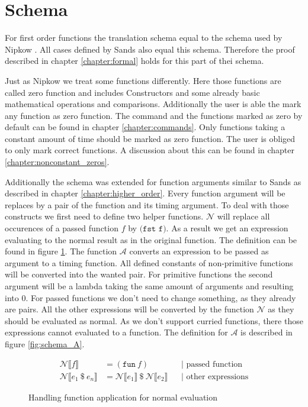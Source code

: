 
\section{Schema} \label{chapter:impl_schema}

For first order functions the translation schema equal to the schema used by Nipkow \parencite{fds}.
All cases defined by Sands also equal this schema.
Therefore the proof described in chapter \ref{chapter:formal} holds for this part of thei schema.

Just as Nipkow we treat some functions differently.
Here those functions are called zero function and includes Constructors and some already basic mathematical operations and comparisons.
Additionally the user is able the mark any function as zero function.
The command and the functions marked as zero by default can be found in chapter \ref{chapter:commands}.
Only functions taking a constant amount of time should be marked as zero function.
The user is obliged to only mark correct functions.
A discussion about this can be found in chapter \ref{chapter:nonconstant_zeros}.

Additionally the schema was extended for function arguments similar to Sands as described in chapter \ref{chapter:higher_order}.
Every function argument will be replaces by a pair of the function and its timing argument.
To deal with those constructs we first need to define two helper functions.
$\mathcal{N}$ will replace all occurences of a passed function $f$ by $\texttt{(fst f)}$.
As a result we get an expression evaluating to the normal result as in the original function.
The definition can be found in figure \ref{fig:schema_N}.
The function $\mathcal{A}$ converts an expression to be passed as argument to a timing function.
All defined constants of non-primitive functions will be converted into the wanted pair.
For primitive functions the second argument will be a lambda taking the same amount of arguments and resulting into $0$.
For passed functions we don't need to change something, as they already are pairs.
All the other expressions will be converted by the function $\mathcal{N}$ as they should be evaluated as normal.
As we don't support curried functions, there those expressions cannot evaluated to a function.
The definition for $\mathcal{A}$ is described in figure \ref{fig:schema_A}.
\begin{figure}
\begin{align*}
  \mathcal{N}\llbracket f\rrbracket &= (\texttt{fun}\ f) &&\text{| passed function}\\
  \mathcal{N}\llbracket e_{1}\ \$\ e_{n}\rrbracket &= \mathcal{N}\llbracket e_{1}\rrbracket\ \$\ \mathcal{N}\llbracket e_{2}\rrbracket &&\text{| other expressions}
\end{align*}
\caption{Handling function application for normal evaluation}
\label{fig:schema_N}
\end{figure}

